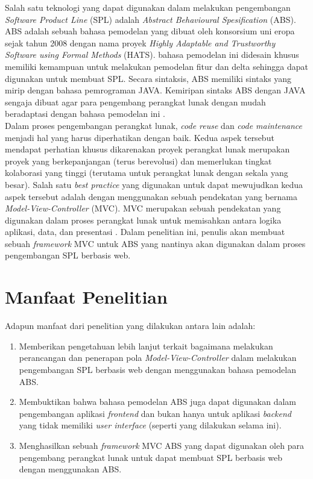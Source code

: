 \noindent
Salah satu teknologi yang dapat digunakan dalam melakukan pengembangan \textit{Software Product Line} (SPL) adalah \textit{Abstract Behavioural Spesification} (ABS). ABS adalah sebuah bahasa pemodelan yang dibuat oleh konsorsium uni eropa sejak tahun 2008 dengan nama proyek \textit{Highly Adaptable and Trustworthy Software using Formal Methods} (HATS). bahasa pemodelan ini didesain khusus memiliki kemampuan untuk melakukan pemodelan fitur dan delta sehingga dapat digunakan untuk membuat SPL. Secara sintaksis, ABS memiliki sintaks yang mirip dengan bahasa pemrograman JAVA. Kemiripan sintaks ABS dengan JAVA sengaja dibuat agar para pengembang perangkat lunak dengan mudah beradaptasi dengan bahasa pemodelan ini \citep{hahnle2013hats}. \\

\noindent
Dalam proses pengembangan perangkat lunak, \textit{code reuse} dan \textit{code maintenance} menjadi hal yang harus diperhatikan dengan baik. Kedua aspek tersebut mendapat perhatian khusus dikarenakan proyek perangkat lunak merupakan proyek yang berkepanjangan (terus berevolusi) dan memerlukan tingkat kolaborasi yang tinggi (terutama untuk perangkat lunak dengan sekala yang besar). Salah satu \textit{best practice} yang digunakan untuk dapat mewujudkan kedua aspek tersebut adalah dengan menggunakan sebuah pendekatan yang bernama \textit{Model-View-Controller} (MVC). MVC merupakan sebuah pendekatan yang digunakan dalam proses perangkat lunak untuk memisahkan antara logika aplikasi, data, dan presentasi \citep{leff2001web} \citep{krasner1988desc}. Dalam penelitian ini, penulis akan membuat sebuah \textit{framework} MVC untuk ABS yang nantinya akan digunakan dalam proses pengembangan SPL berbasis web.

\section{Manfaat Penelitian}
Adapun manfaat dari penelitian yang dilakukan antara lain adalah:
\begin{enumerate}
    \item Memberikan pengetahuan lebih lanjut terkait bagaimana melakukan perancangan dan penerapan pola \textit{Model-View-Controller} dalam melakukan pengembangan SPL berbasis web dengan menggunakan bahasa pemodelan ABS.
    \item Membuktikan bahwa bahasa pemodelan ABS juga dapat digunakan dalam pengembangan aplikasi \textit{frontend} dan bukan hanya untuk aplikasi \textit{backend} yang tidak memiliki \textit{user interface} (seperti yang dilakukan selama ini).
    \item Menghasilkan sebuah \textit{framework} MVC ABS yang dapat digunakan oleh para pengembang perangkat lunak untuk dapat membuat SPL berbasis web dengan menggunakan ABS.
\end{enumerate}

